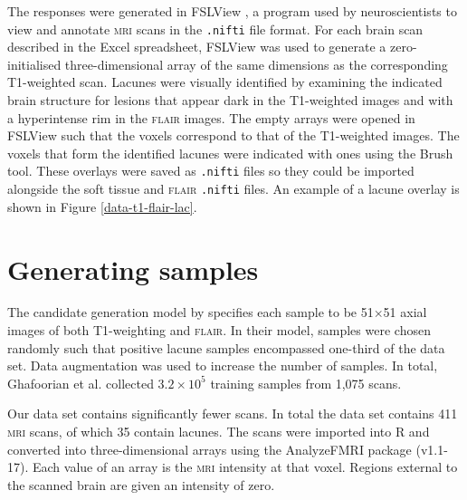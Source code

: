 The responses were generated in FSLView \citeyearpar{fslview}, a program used by neuroscientists to view and annotate \textsc{mri} scans in the \texttt{.nifti} file format. For each brain scan described in the Excel spreadsheet, FSLView \citeyearpar{fslview} was used to generate a zero-initialised three-dimensional array of the same dimensions as the corresponding T1-weighted scan. Lacunes were visually identified by examining the indicated brain structure for lesions that appear dark in the T1-weighted images and with a hyperintense rim in the \textsc{flair} images. The empty arrays were opened in FSLView \citeyearpar{fslview} such that the voxels correspond to that of the T1-weighted images. The voxels that form the identified lacunes were indicated with ones using the Brush tool. These overlays were saved as \texttt{.nifti} files so they could be imported alongside the soft tissue and \textsc{flair} \texttt{.nifti} files. An example of a lacune overlay is shown in Figure \ref{data-t1-flair-lac}.




\section{Generating samples}\label{data-samples}

The candidate generation model by \cite{GhafoorianM.2017Dml3} specifies each sample to be 51$\times$51 axial images of both T1-weighting and \textsc{flair}. In their model, samples were chosen randomly such that positive lacune samples encompassed one-third of the data set. Data augmentation was used to increase the number of samples. In total, Ghafoorian et al. collected $3.2\times10^5$ training samples from 1,075 scans.

Our data set contains significantly fewer scans. In total the data set contains 411 \textsc{mri} scans, of which 35 contain lacunes. The scans were imported into R and converted into three-dimensional arrays using the AnalyzeFMRI package (v1.1-17). Each value of an array is the \textsc{mri} intensity at that voxel. Regions external to the scanned brain are given an intensity of zero.

